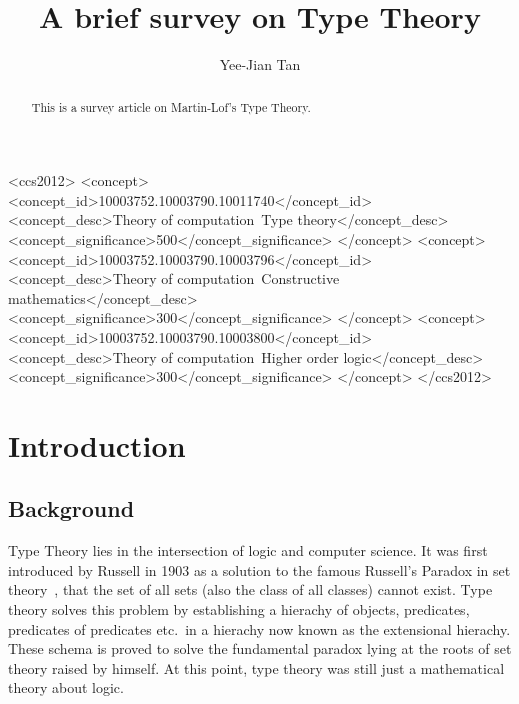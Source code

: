 \documentclass[acmsmall]{acmart}
\begin{document}
\title{A brief survey on Type Theory}

\author{Yee-Jian Tan}

\begin{abstract}
  This is a survey article on Martin-Lof's Type Theory.
\end{abstract}

\begin{CCSXML}
<ccs2012>
   <concept>
       <concept_id>10003752.10003790.10011740</concept_id>
       <concept_desc>Theory of computation~Type theory</concept_desc>
       <concept_significance>500</concept_significance>
       </concept>
   <concept>
       <concept_id>10003752.10003790.10003796</concept_id>
       <concept_desc>Theory of computation~Constructive mathematics</concept_desc>
       <concept_significance>300</concept_significance>
       </concept>
   <concept>
       <concept_id>10003752.10003790.10003800</concept_id>
       <concept_desc>Theory of computation~Higher order logic</concept_desc>
       <concept_significance>300</concept_significance>
       </concept>
 </ccs2012>
\end{CCSXML}



\maketitle

\section{Introduction}
\subsection{Background}
Type Theory lies in the intersection of logic and computer science. It was first
introduced by Russell in 1903 as a solution to the famous Russell's Paradox in
set theory~\cite{coquand2019type}, that the set of all sets (also the class of
all classes) cannot exist. Type theory solves this problem by establishing a
hierachy of objects, predicates, predicates of predicates etc.\ in a hierachy
now known as the extensional hierachy. These schema is proved to solve the
fundamental paradox lying at the roots of set theory raised by himself. At this
point, type theory was still just a mathematical theory about logic.
\end{document}
